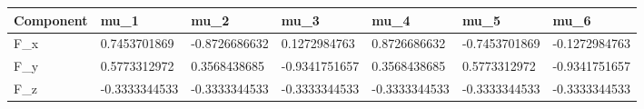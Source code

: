\begin{tabular}{@{}lllllll@{}}
\toprule
Component & mu\_1 & mu\_2 & mu\_3 & mu\_4 & mu\_5 & mu\_6 \\
\midrule
F\_x & 0.7453701869 & -0.8726686632 & 0.1272984763 & 0.8726686632 & -0.7453701869 & -0.1272984763 \\
F\_y & 0.5773312972 & 0.3568438685 & -0.9341751657 & 0.3568438685 & 0.5773312972 & -0.9341751657 \\
F\_z & -0.3333344533 & -0.3333344533 & -0.3333344533 & -0.3333344533 & -0.3333344533 & -0.3333344533 \\
\bottomrule
\end{tabular}
